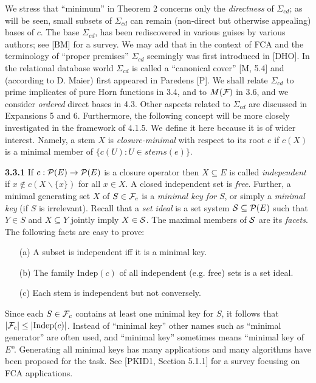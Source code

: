 \documentclass[11pt]{article}
\newcommand{\ra}{\rightarrow}
\begin{document}
We stress that ``minimum'' in Theorem 2 concerns only the {\it directness} of $\Sigma_{cd}$; as will be seen, small subsets of $\Sigma_{cd}$ can remain (non-direct but otherwise appealing) bases of $c$.  The base $\Sigma_{cd}$, has been rediscovered in various guises by various authors; see [BM] for a survey. We may add that in the context of FCA and the terminology of ``proper premises'' $\Sigma_{cd}$ seemingly was first introduced in [DHO]. In the relational database world $\Sigma_{cd}$ is called a ``canonical cover'' [M, 5.4] and (according to D. Maier) first appeared in Paredens [P].
We shall relate $\Sigma_{cd}$ to prime implicates of pure Horn functions in 3.4, and to $M({\cal F})$ in 3.6, and we consider {\it ordered} direct bases in 4.3. Other aspects related to $\Sigma_{cd}$ are discussed in Expansions 5 and 6. Furthermore, the following concept will be more closely investigated in the framework of 4.1.5. We define it here because it is of wider interest. Namely, a stem $X$ is {\it closure-minimal} with respect to its root $e$ if $c(X)$ is a minimal member of $\{c(U): U \in stems(e)\}$.


{\bf 3.3.1} If $c: {\cal P}(E) \ra {\cal P}(E)$ is a closure operator then $X \subseteq E$ is called {\it independent} if  $x \not\in c(X \backslash \{x\})$ for all $x \in X$. A closed independent set is {\it free}. Further, a minimal generating set $X$ of $S \in {\cal F}_c$ is a {\it minimal key for} $S$, or simply a {\it minimal key} (if $S$ is irrelevant). Recall that a {\it set ideal} is a set system ${\cal S} \subseteq {\cal P}(E)$ such that $Y \in S$ and $X \subseteq Y$ jointly imply $X \in {\cal S}$. The maximal members of ${\cal S}$ are its {\it facets}. The following facts  are easy to prove:
\begin{enumerate}
	\item [(a)] A subset is independent iff it is a minimal key.
	\item[(b)] The family Indep$(c)$ of all independent (e.g. free) sets is a set ideal.
	\item[(c)] Each stem is independent  but not conversely.
\end{enumerate}
Since each $S \in {\cal F}_c$ contains at least one minimal key for $S$, it follows that $|{\cal F}_c| \leq |\mbox{Indep}(c)|$.
 Instead of ``minimal key'' other names such as ``minimal generator'' are often used, and ``minimal key'' sometimes means ``minimal key of $E$''. Generating all minimal keys has many applications and many algorithms have been proposed for the task. See [PKID1, Section 5.1.1] for a survey focusing on FCA applications.
\end{document}
